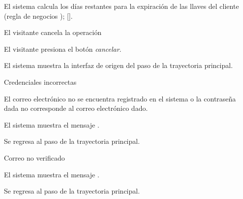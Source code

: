 {\begin{trayectoriaPrincipal}
    \item El sistema calcula los días restantes para la expiración de las
      llaves del cliente (regla de negocios
      );
      [].

  \end{trayectoriaPrincipal}


  \begin{trayectoriaAlternativa}[ta:cancelar]
    {El visitante cancela la operación}

    \item El visitante presiona el botón \textit{cancelar}.

    \item El sistema muestra la interfaz de origen del paso
       de la trayectoria principal.

  \end{trayectoriaAlternativa}


  \begin{trayectoriaAlternativa}
    {Credenciales incorrectas}

    \item El correo electrónico no se encuentra registrado en el sistema o la
      contraseña dada no corresponde al correo electrónico dado.

    \item El sistema muestra el mensaje
      .

    \item Se regresa al paso  de la trayectoria
      principal.

  \end{trayectoriaAlternativa}


  \begin{trayectoriaAlternativa}
    {Correo no verificado}

    \item El sistema muestra el mensaje
      .

    \item Se regresa al paso  de la trayectoria
      principal.


\end{trayectoriaAlternativa}}
